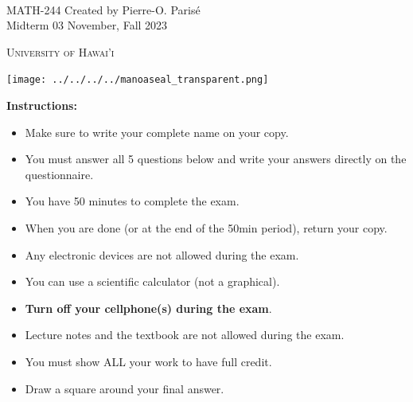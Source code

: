 \documentclass[addpoints, 12pt]{exam}%
\theoremstyle{definition}
\begin{document}
	\noindent \hrulefill \\
	\noindent MATH-244 \hfill Created by Pierre-O. Paris{\'e}\\
	Midterm 03 \hfill November, Fall 2023\\\vspace*{-0.7cm}

\noindent\hrulefill

\vspace*{0.5cm}

\begin{center}
\begin{minipage}{0.6\textwidth}
\begin{Huge}
\textsc{University of Hawai'i}
\end{Huge}
\end{minipage}
\begin{minipage}{0.12\textwidth}
\texttt{[image: ../../../../manoaseal\_transparent.png]}
\end{minipage}
\end{center}
	
\vspace*{0.5cm}

\noindent{}

\vspace*{0.5cm}

\noindent{}

\vspace*{1cm}

\begin{center}
\gradetable[h][questions]
\end{center}

\vspace*{1cm}

\noindent\textbf{Instructions:} 

\begin{itemize}
\item Make sure to write your complete name on your copy. 
\item You must answer all 5 questions below and write your answers directly on the questionnaire.
\item You have 50 minutes to complete the exam.
\item When you are done (or at the end of the 50min period), return your copy. 
\item Any electronic devices are not allowed during the exam. 
\item You can use a scientific calculator (not a graphical).
\item \textbf{Turn off your cellphone(s) during the exam}.
\item Lecture notes and the textbook are not allowed during the exam. 
\item You must show ALL your work to have full credit.
\item Draw a square around your final answer.
\end{itemize}
\end{document}

